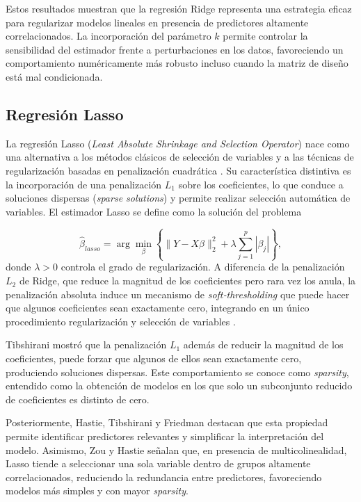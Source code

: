 \documentclass[12pt,a4paper]{report}
\begin{document}
Estos resultados muestran que la regresión Ridge representa una estrategia eficaz para regularizar modelos lineales en presencia de predictores altamente correlacionados. La incorporación del parámetro \(k\) permite controlar la sensibilidad del estimador frente a perturbaciones en los datos, favoreciendo un comportamiento numéricamente más robusto incluso cuando la matriz de diseño está mal condicionada.

\subsection{Regresión Lasso}

La regresión Lasso (\textit{Least Absolute Shrinkage and Selection Operator}) nace como una alternativa a los métodos clásicos de selección de variables y a las técnicas de regularización basadas en penalización cuadrática \cite{tibshirani1996}. Su característica distintiva es la incorporación de una penalización \(L_1\) sobre los coeficientes, lo que conduce a soluciones dispersas (\textit{sparse solutions}) y permite realizar selección automática de variables. El estimador Lasso se define como la solución del problema

\[
\hat{\beta}_{lasso}
= \arg\min_{\beta}
\left\{
\|Y - X\beta\|_2^2
+ \lambda \sum_{j=1}^p |\beta_j|
\right\},
\]
donde \(\lambda > 0\) controla el grado de regularización. A diferencia de la penalización \(L_2\) de Ridge, que reduce la magnitud de los coeficientes pero rara vez los anula, la penalización absoluta induce un mecanismo de \textit{soft‑thresholding} que puede hacer que algunos coeficientes sean exactamente cero, integrando en un único procedimiento regularización y selección de variables \cite{hastie2009}.

Tibshirani \cite{tibshirani1996} mostró que la penalización \(L_1\) además de reducir la magnitud de los coeficientes, puede forzar que algunos de ellos sean exactamente cero, produciendo soluciones dispersas. Este comportamiento se conoce como \textit{sparsity}, entendido como la obtención de modelos en los que solo un subconjunto reducido de coeficientes es distinto de cero.

Posteriormente, Hastie, Tibshirani y Friedman \cite{hastie2009} destacan que esta propiedad permite identificar predictores relevantes y simplificar la interpretación del modelo. Asimismo, Zou y Hastie \cite{zou2005} señalan que, en presencia de multicolinealidad, Lasso tiende a seleccionar una sola variable dentro de grupos altamente correlacionados, reduciendo la redundancia entre predictores, favoreciendo modelos más simples y con mayor \textit{sparsity}.
\end{document}
